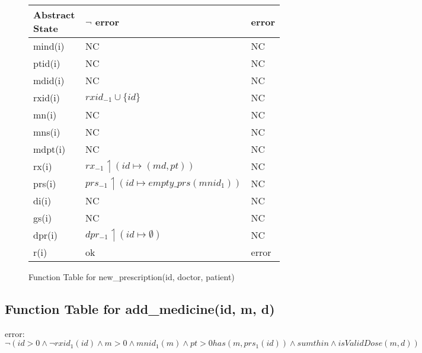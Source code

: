 \begin{figure}[h]
\begin{center}

\begin{tabular}{|l|l|l|}
\hline
Abstract State & $\neg$ error & error \\ \hline
mind(i)        &     NC      & NC    \\ \hline
ptid(i)        &       NC    & NC    \\ \hline
mdid(i)        &     NC      & NC    \\ \hline
rxid(i)        &     $rxid_{-1} \cup \{id\}$      & NC    \\ \hline
mn(i)          &      NC     & NC    \\ \hline
mns(i)         &     NC      & NC    \\ \hline
mdpt(i)        &    NC       & NC    \\ \hline
rx(i)          &      $rx_{-1} \upharpoonleft (id \mapsto (md, pt))$     & NC    \\ \hline
prs(i)         &      $prs_{-1} \upharpoonleft (id \mapsto empty\_prs(mnid_{1}))$      & NC    \\ \hline
di(i)          &        NC   & NC    \\ \hline
gs(i)          &       NC    & NC    \\ \hline
dpr(i)         &     $dpr_{-1} \upharpoonleft (id \mapsto \emptyset)$      & NC    \\ \hline
r(i)           & ok        & error \\ \hline
\end{tabular}

\caption{Function Table for new\_prescription(id, doctor, patient)}
\label{ft-np}
\end{center}
\end{figure}

\newpage

\subsection{Function Table for add\_medicine(id, m, d)}

error: $\neg (id > 0 \wedge \neg rxid_{1}(id) \wedge m > 0  \wedge mnid_{1}(m) \wedge pt > 0 has(m, prs_{1}(id))\wedge sumthin \wedge isValidDose(m,d))$

